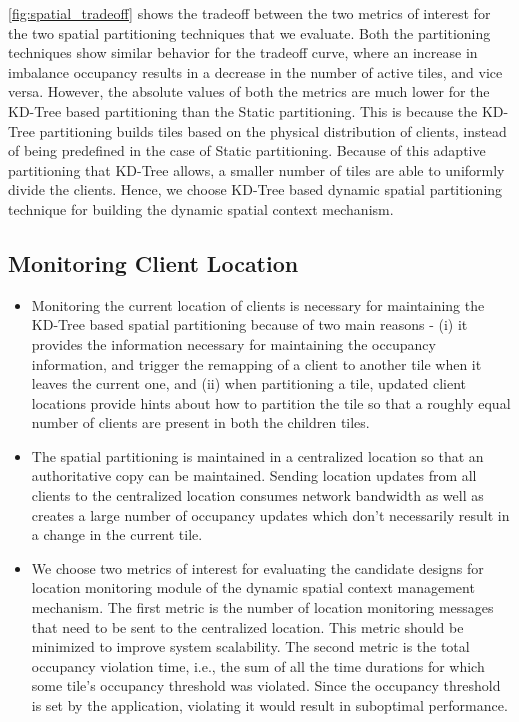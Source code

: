 \cref{fig:spatial_tradeoff} shows the tradeoff between the two metrics of interest for the two spatial partitioning techniques that we evaluate. Both the partitioning techniques show similar behavior for the tradeoff curve, where an increase in imbalance occupancy results in a decrease in the number of active tiles, and vice versa. However, the absolute values of both the metrics are much lower for the KD-Tree based partitioning than the Static partitioning. This is because the KD-Tree partitioning builds tiles based on the physical distribution of clients, instead of being predefined in the case of Static partitioning. Because of this adaptive partitioning that KD-Tree allows, a smaller number of tiles are able to uniformly divide the clients. Hence, we choose KD-Tree based dynamic spatial partitioning technique for building the dynamic spatial context mechanism.
\subsection{Monitoring Client Location}
\begin{itemize}
\item Monitoring the current location of clients is necessary for maintaining the KD-Tree based spatial partitioning because of two main reasons - (i) it provides the information necessary for maintaining the occupancy information, and trigger the remapping of a client to another tile when it leaves the current one, and (ii) when partitioning a tile, updated client locations provide hints about how to partition the tile so that a roughly equal number of clients are present in both the children tiles.
\item The spatial partitioning is maintained in a centralized location so that an authoritative copy can be maintained. Sending location updates from all clients to the centralized location consumes network bandwidth as well as creates a large number of occupancy updates which don't necessarily result in a change in the current tile. 
\item We choose two metrics of interest for evaluating the candidate designs for location monitoring module of the dynamic spatial context management mechanism. The first metric is the number of location monitoring messages that need to be sent to the centralized location. This metric should be minimized to improve system scalability. The second metric is the total occupancy violation time, i.e., the sum of all the time durations for which some tile's occupancy threshold was violated. Since the occupancy threshold is set by the application, violating it would result in suboptimal performance.
\end{itemize}


